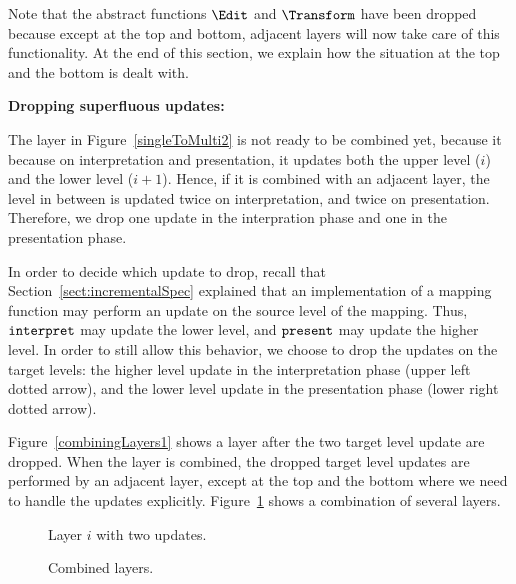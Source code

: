 Note that the abstract functions $\Edit$ and $\Transform$ have been dropped because except at the top and bottom, adjacent layers will now take care of this functionality. At the end of this section, we explain how the situation at the top and the bottom is dealt with.

\bigskip
{\bf Dropping superfluous updates:} 

The layer in Figure~\ref{singleToMulti2} is not ready to be combined yet, because it because on interpretation and presentation, it updates both the upper level ($i$) and the lower level ($i+1$). Hence, if it is combined with an adjacent layer, the level in between is updated twice on interpretation, and twice on presentation. Therefore, we drop one update in the interpration phase and one in the presentation phase. 

In order to decide which update to drop, recall that Section~\ref{sect:incrementalSpec} explained that an implementation of a mapping function may perform an update on the source level of the mapping. Thus, 
${\tt interpret}$ may update the lower level, and ${\tt present}$ may update the higher level. In order to still allow this behavior, we choose to drop the updates on the target levels: the higher level update in the interpretation phase (upper left dotted arrow), and the lower level update in the presentation phase (lower right dotted arrow). 

Figure~\ref{combiningLayers1} shows a layer after the two target level update are dropped. When the layer is combined, the dropped target level updates are performed by an adjacent layer, except at the top and the bottom where we need to handle the updates explicitly. Figure~\ref{combiningLayers2} shows a combination of several layers.

\begin{figure}[h]
  \hfill
  \begin{minipage}[b]{.45\textwidth}
    \begin{center}  
      \caption{Layer $i$ with two updates.} \label{combiningLayers1}
    \end{center}
  \end{minipage}
  \hfill
  \begin{minipage}[b]{.45\textwidth}
    \begin{center}  
      \caption{Combined layers.} \label{combiningLayers2}
    \end{center}
  \end{minipage}
  \hfill
\end{figure}


